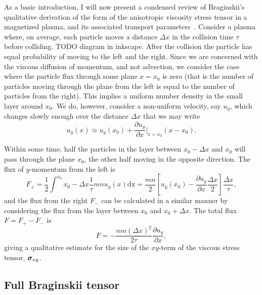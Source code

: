 As a basic introduction, I will now present a condensed review of Braginskii's qualitative derivation of the form of the anisotropic viscosity stress tensor in a magnetized plasma, and its associated transport parameters~\cite{braginskiiTransportProcessesPlasma1965}. Consider a plasma where, on average, each particle moves a distance $\Delta x$ in the collision time $\tau$ before colliding. TODO diagram in inkscape. After the collision the particle has equal probability of moving to the left and the right. Since we are concerned with the viscous diffusion of momentum, and not advection, we consider the case where the particle flux through some plane $x=x_0$ is zero (that is the number of particles moving through the plane from the left is equal to the number of particles from the right). This implies a uniform number density in the small layer around $x_0$. We do, however, consider a non-uniform velocity, say $u_y$, which changes slowly enough over the distance $\Delta x$ that we may write
\begin{equation}
  \label{eq:viscous_derivation_vy}
u_y (x) \approx u_y(x_0) + \frac{\partial u_y}{\partial x} |_{x=x_0} (x - x_0).
\end{equation}

Within some time, half the particles in the layer between $x_0 - \Delta x$ and $x_0$ will pass through the plane $x_0$, the other half moving in the opposite direction. The flux of $y$-momentum from the left is
\begin{equation}
  \label{eq:momentum_flux_left}
F_{+} = \frac{1}{2} \int^{x_0}{x_0 - \Delta x} \frac{1}{\tau} m n u_y(x) \text{dx} = \frac{mn}{2} \left[ u_y(x_0) - \frac{\partial u_y}{\partial x} \frac{\Delta x}{2} \right] \frac{\Delta x}{\tau},
\end{equation}
and the flux from the right $F_{-}$ can be calculated in a similar manner by considering the flux from the layer between $x_0$ and $x_0 + \Delta x$. The total flux $F = F_+ - F_-$ is
\begin{equation}
  \label{eq:total_momentum_flux}
  F = - \frac{nm(\Delta x)^2}{2\tau} \frac{\partial u_y}{\partial x},
\end{equation}
giving a qualitative estimate for the size of the $xy$-term of the viscous stress tensor, ${\bm \sigma}_{xy}$. 

\subsection{Full Braginskii tensor}


